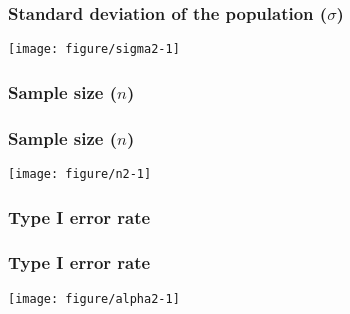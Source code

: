\documentclass[color=usenames,dvipsnames]{beamer}\usepackage[]{graphicx}\usepackage[]{color}
\begin{document}
\begin{frame}[fragile]
  \frametitle{Standard deviation of the population ($\sigma$)}
\texttt{[image: figure/sigma2-1]}
\end{frame}











\begin{frame}[fragile]
  \frametitle{Sample size ($n$)}


\end{frame}







\begin{frame}[fragile]
  \frametitle{Sample size ($n$)}
  \texttt{[image: figure/n2-1]}
\end{frame}






\begin{frame}[fragile]
  \frametitle{Type I error rate}


\end{frame}





\begin{frame}[fragile]
  \frametitle{Type I error rate}
  \texttt{[image: figure/alpha2-1]}
\end{frame}








\end{document}
